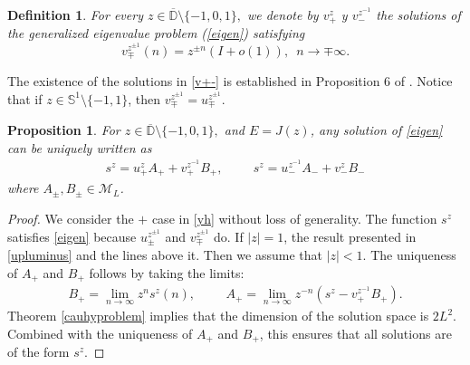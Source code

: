 \documentclass[12pt,oneside,onecolumn,open]{article}
\newtheorem{defi}[teo]{Definition}
\newtheorem{propo}[teo]{Proposition}
\newtheorem{obs}[teo]{Remark}
\begin{document}
\begin{defi}\label{vsolutions}
     For every $z\in \overline{\mathbb{D}}\setminus \{-1, 0, 1\},$ we denote by  $v^{z}_{+}$ y $v^{z^{-1}}_{-}$ the solutions of the generalized eigenvalue problem (\ref{eigen}) 
satisfying 
\begin{equation}
\label{v+-}
 v^{z^{\pm 1}}_\mp(n)=z^{\pm n}(I+o(1)),\,\,\, n\to \mp \infty .
\end{equation}

\end{defi}
The existence of the solutions in \eqref{v+-} is established in Proposition 6 of \cite{MR4760547}. Notice that   if $z \in \mathbb{S}^1\setminus \{-1,  1\}$, then $ v^{z^{\pm 1}}_\mp =u^{z^{\pm 1}}_\mp$.

\begin{propo}\label{base}
For $z\in \overline{\mathbb{D}}\setminus \{-1, 0, 1\},$ and $E=J(z)$, any solution of \eqref{eigen} can be uniquely written as 
\begin{align}\label{yh}
s^{z} = u^{z}_+ A_+ + v^{z^{- 1}}_+ B_+, \hspace{1cm} 
s^{z} = u^{z^{ - 1}}_- A_- + v^{z}_- B_-
\end{align} 
where $A_\pm,B_\pm \in \mathcal{M}_{L}$. 
\end{propo}

\begin{proof}
We consider the $+$ case in \eqref{yh} without loss of generality. The function $s^z$ satisfies \eqref{eigen} because $u^{z^{\pm 1}}_\pm$ and  $v^{z^{\pm 1}}_\mp$ do. If $ |z| =1 $, the result presented in \eqref{upluminus} and the lines above it. Then we assume that $|z| < 1$. The uniqueness of $A_{+}$ and $B_+$ follows by taking the limits:
\begin{align}
    B_+ = \lim_{n \to \infty} z^n s^{z}(n), \hspace{1cm} A_+ = \lim_{n \to \infty} z^{-n}(s^z - v^{z^{-1}}_+ B_+).
\end{align}
Theorem \ref{cauhyproblem} implies that the dimension of the solution space is $2L^2$. Combined with the uniqueness of $A_+$ and $B_+$, this ensures that all solutions are of the form $s^z$.
\end{proof}


 \color{black}
 
\end{document}
